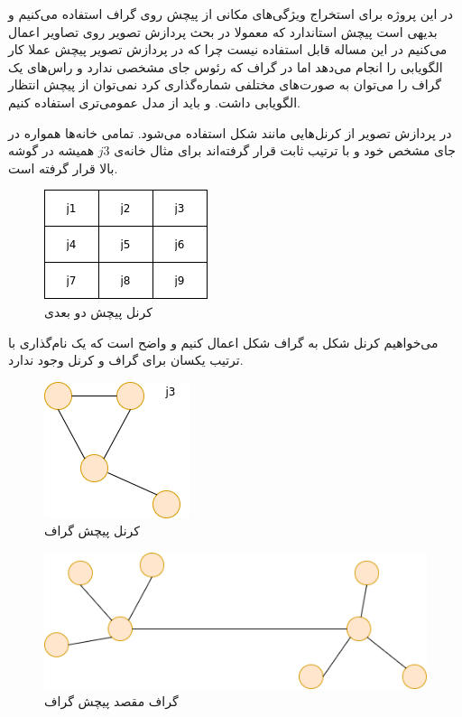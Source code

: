 \documentclass{article}
\begin{document}
در این پروژه برای استخراج ویژگی‌های مکانی از پیچش روی گراف استفاده می‌کنیم و بدیهی است پیچش استاندارد که معمولا
در بحث پردازش تصویر روی تصاویر اعمال می‌کنیم در این مساله قابل استفاده نیست
چرا که در پردازش تصویر پیچش عملا کار الگویابی را انجام می‌دهد اما در گراف که رئوس جای مشخصی ندارد
و راس‌های یک گراف را می‌توان به صورت‌های مختلفی
شماره‌گذاری کرد نمی‌توان از پیچش انتظار الگویابی داشت.
و باید از مدل عمومی‌تری استفاده کنیم.

در پردازش تصویر از کرنل‌هایی مانند شکل  استفاده می‌شود. تمامی خانه‌ها همواره در جای مشخص خود و با ترتیب ثابت قرار گرفته‌اند
برای مثال خانه‌ی $j3$ همیشه در گوشه بالا قرار گرفته است.

\begin{figure}
  \includegraphics[]{./images/2d-convolution.png}
  \centering
  \caption{کرنل پیچش دو بعدی}
  \label{fig:2d-convolution}
\end{figure}

می‌خواهیم کرنل شکل 
به گراف شکل  اعمال کنیم و واضح است که یک نام‌گذاری با ترتیب یکسان برای گراف و کرنل وجود ندارد.


\begin{figure}
  \includegraphics[]{./images/graph-convolution-kernel.png}
  \centering
  \caption{کرنل پیچش گراف}
  \label{fig:graph-convolution-kernel}
\end{figure}

\begin{figure}
  \includegraphics[]{./images/graph-convolution-graph.png}
  \centering
  \caption{گراف مقصد پیچش گراف}
  \label{fig:graph-convolution-graph}
\end{figure}
\end{document}
